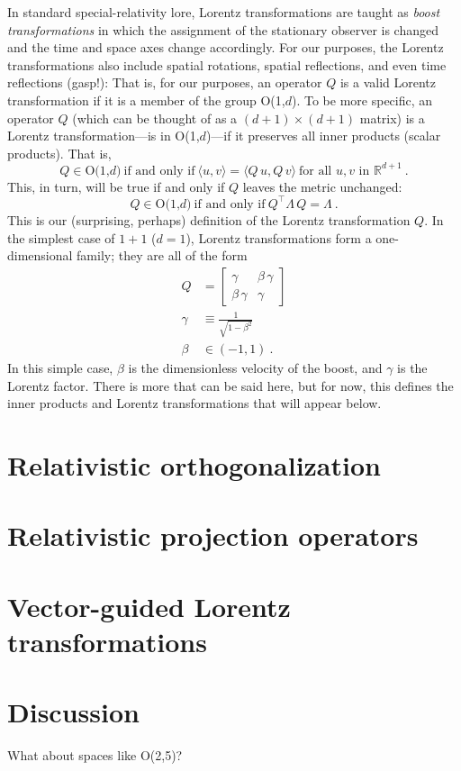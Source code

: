 \documentclass{article}
\newcommand{\inner}[2]{\langle{#1},{#2}\rangle}
\begin{document}
In standard special-relativity lore, Lorentz transformations are taught as \emph{boost transformations} in which the assignment of the stationary observer is changed and the time and space axes change accordingly.
For our purposes, the Lorentz transformations also include spatial rotations, spatial reflections, and even time reflections (gasp!):
That is, for our purposes, an operator $Q$ is a valid Lorentz transformation if it is a member of the group O(1,$d$).
To be more specific, an operator $Q$ (which can be thought of as a $(d+1)\times(d+1)$ matrix) is a Lorentz transformation---is in O(1,$d$)---if it preserves all inner products (scalar products). That is,
\begin{equation}
    Q \in \mbox{O(1,$d$)} ~ \mbox{if and only if} ~ \inner{u}{v}=\inner{Q\,u}{Q\,v} ~ \mbox{for all $u,v$ in $\mathbb{R}^{d+1}$} ~ .
\end{equation}
This, in turn, will be true if and only if $Q$ leaves the metric unchanged:
\begin{equation}
    Q \in \mbox{O(1,$d$)} ~ \mbox{if and only if} ~ Q^\top\Lambda\,Q=\Lambda ~ .
\end{equation}
This is our (surprising, perhaps) definition of the Lorentz transformation $Q$.
In the simplest case of $1+1$ ($d=1$), Lorentz transformations form a one-dimensional family; they are all of the form
\begin{align}
    Q &= \begin{bmatrix}\gamma & \beta\,\gamma \\ \beta\,\gamma & \gamma\end{bmatrix}
    \\
    \gamma &\equiv \frac{1}{\sqrt{1 - \beta^2}}
    \\
    \beta &\in (-1,1) ~.
\end{align}
In this simple case, $\beta$ is the dimensionless velocity of the boost, and $\gamma$ is the Lorentz factor.
There is more that can be said here, but for now, this defines the inner products and Lorentz transformations that will appear below.

\section{Relativistic orthogonalization}

\section{Relativistic projection operators}

\section{Vector-guided Lorentz transformations}

\section{Discussion}

What about spaces like O(2,5)?
\end{document}
